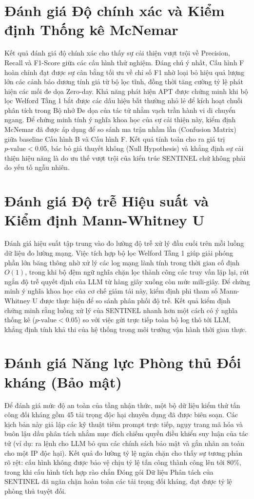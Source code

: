 \section{Đánh giá Độ chính xác và Kiểm định Thống kê McNemar}
Kết quả đánh giá độ chính xác cho thấy sự cải thiện vượt trội về Precision, Recall và F1-Score giữa các cấu hình thử nghiệm. Đáng chú ý nhất, Cấu hình F hoàn chỉnh đạt được sự cân bằng tối ưu về chỉ số F1 nhờ loại bỏ hiệu quả lượng lớn các cảnh báo dương tính giả từ bộ lọc tĩnh, đồng thời tăng cường tỷ lệ phát hiện các mối đe dọa Zero-day. Khả năng phát hiện APT được chứng minh khi bộ lọc Welford Tầng 1 bắt được các dấu hiệu bất thường nhỏ lẻ để kích hoạt chuỗi phân tích trong Bộ nhớ Đe dọa của tác tử nhằm vạch trần hành vi di chuyển ngang. Để chứng minh tính ý nghĩa khoa học của sự cải thiện này, kiểm định McNemar đã được áp dụng để so sánh ma trận nhầm lẫn (Confusion Matrix) giữa baseline Cấu hình B và Cấu hình F. Kết quả tính toán cho ra giá trị $p\text{-value} < 0.05$, bác bỏ giả thuyết không (Null Hypothesis) và khẳng định sự cải thiện hiệu năng là do ưu thế vượt trội của kiến trúc SENTINEL chứ không phải do yếu tố ngẫu nhiên.

\section{Đánh giá Độ trễ Hiệu suất và Kiểm định Mann-Whitney U}
Đánh giá hiệu suất tập trung vào đo lường độ trễ xử lý đầu cuối trên mỗi luồng dữ liệu đo lường mạng. Việc tích hợp bộ lọc Welford Tầng 1 giúp giải phóng phần lớn băng thông nhờ xử lý các log mạng lành tính trong thời gian cố định $O(1)$, trong khi bộ đệm ngữ nghĩa chặn lọc thành công các truy vấn lặp lại, rút ngắn độ trễ quyết định của LLM từ hàng giây xuống còn mức mili-giây. Để chứng minh ý nghĩa khoa học của cơ chế giảm tải này, kiểm định phi tham số Mann-Whitney U được thực hiện để so sánh phân phối độ trễ. Kết quả kiểm định chứng minh rằng luồng xử lý của SENTINEL nhanh hơn một cách có ý nghĩa thống kê ($p\text{-value} < 0.05$) so với việc gửi trực tiếp toàn bộ log thô tới LLM, khẳng định tính khả thi của hệ thống trong môi trường vận hành thời gian thực.

\section{Đánh giá Năng lực Phòng thủ Đối kháng (Bảo mật)}
Để đánh giá mức độ an toàn của tầng nhận thức, một bộ dữ liệu kiểm thử tấn công đối kháng gồm 45 tải trọng độc hại chuyên dụng đã được biên soạn. Các kịch bản này giả lập các kỹ thuật tiêm prompt trực tiếp, ngụy trang mã hóa và buôn lậu dấu phân tách nhằm mục đích chiếm quyền điều khiển suy luận của tác tử (ví dụ: ra lệnh cho LLM bỏ qua các chính sách bảo mật và gắn nhãn an toàn cho một IP độc hại). Kết quả đo lường tỷ lệ ngăn chặn cho thấy sự tương phản rõ rệt: cấu hình không được bảo vệ chịu tỷ lệ tấn công thành công lên tới 80\%, trong khi cấu hình tích hợp rào chắn Đóng gói Dữ liệu Phân tách của SENTINEL đã ngăn chặn hoàn toàn các tải trọng đối kháng, đạt được tỷ lệ phòng thủ tuyệt đối.

